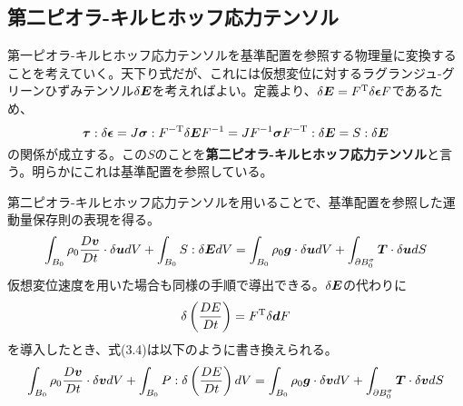 \documentclass[dvipdfmx, 9pt, a4paper]{jsarticle}
\numberwithin{equation}{section}
\newcommand{\bm}[1]{{\mbox{\boldmath $#1$}}}
\begin{document}
\subsection{第二ピオラ-キルヒホッフ応力テンソル}
第一ピオラ-キルヒホッフ応力テンソルを基準配置を参照する物理量に変換することを考えていく。天下り式だが、これには仮想変位に対するラグランジュ-グリーンひずみテンソル$\delta \bm E$を考えればよい。定義より、$\delta \bm E=F^{\rm T}\delta \bm \epsilon F$であるため、
\begin{equation}
\bm \tau:\delta \bm \epsilon=J\bm \sigma:F^{-\rm T}\delta \bm EF^{-1}=JF^{-1}\bm \sigma F^{-\rm T}:\delta \bm E=S:\delta \bm E
\end{equation}
の関係が成立する。この$S$のことを{\bf 第二ピオラ-キルヒホッフ応力テンソル}と言う。明らかにこれは基準配置を参照している。\par
第二ピオラ-キルヒホッフ応力テンソルを用いることで、基準配置を参照した運動量保存則の表現を得る。
\begin{equation}
\int_{B_0} \rho_0\frac{D\bm v}{Dt}\cdot \delta \bm udV + \int_{B_0}S : \delta \bm E dV=\int_{B_0}\rho_0\bm g\cdot \delta \bm udV+\int_{\partial B_0^\sigma}\bm T\cdot \delta \bm udS
\end{equation}
仮想変位速度を用いた場合も同様の手順で導出できる。$\delta \bm E$の代わりに
\begin{equation}
\delta \left(\frac{DE}{Dt}\right)=F^{\rm T}\delta \bm dF \notag
\end{equation}
を導入したとき、式(3.4)は以下のように書き換えられる。
\begin{equation}
\int_{B_0} \rho_0\frac{D\bm v}{Dt}\cdot \delta \bm vdV + \int_{B_0}P : \delta \left(\frac{DE}{Dt}\right)  dV=\int_{B_0}\rho_0\bm g\cdot \delta \bm vdV+\int_{\partial B_0^\sigma}\bm T\cdot \delta \bm vdS
\end{equation}
\end{document}
